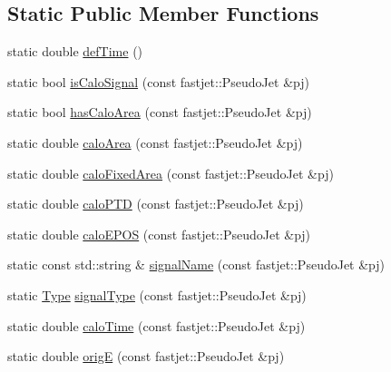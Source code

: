 \subsection*{Static Public Member Functions}
\begin{DoxyCompactItemize}
\item 
static double \hyperlink{classAnalysis_1_1FastJet_1_1CaloSignalInfo_aa4008fb819a90eba42de259914b9f799}{def\+Time} ()
\item 
static bool \hyperlink{classAnalysis_1_1FastJet_1_1CaloSignalInfo_ad3987a22c21aafdb3f074dfe6c15ddd4}{is\+Calo\+Signal} (const fastjet\+::\+Pseudo\+Jet \&pj)
\item 
static bool \hyperlink{classAnalysis_1_1FastJet_1_1CaloSignalInfo_a1d00cdcaf5f0c17d9d6aa07f1ec3e486}{has\+Calo\+Area} (const fastjet\+::\+Pseudo\+Jet \&pj)
\item 
static double \hyperlink{classAnalysis_1_1FastJet_1_1CaloSignalInfo_a5585d0b0e21cf7261fbfdd37d88de689}{calo\+Area} (const fastjet\+::\+Pseudo\+Jet \&pj)
\item 
static double \hyperlink{classAnalysis_1_1FastJet_1_1CaloSignalInfo_ab1772259e0578e51056a8e1cc8cdd342}{calo\+Fixed\+Area} (const fastjet\+::\+Pseudo\+Jet \&pj)
\item 
static double \hyperlink{classAnalysis_1_1FastJet_1_1CaloSignalInfo_a3cc740a3b70b82def83ffb9a6ff43cd3}{calo\+P\+TD} (const fastjet\+::\+Pseudo\+Jet \&pj)
\item 
static double \hyperlink{classAnalysis_1_1FastJet_1_1CaloSignalInfo_ac68b4786735b76e511b2f9b801025833}{calo\+E\+P\+OS} (const fastjet\+::\+Pseudo\+Jet \&pj)
\item 
static const std\+::string \& \hyperlink{classAnalysis_1_1FastJet_1_1CaloSignalInfo_a4bcba28ea7871f884c727df5f4d2520b}{signal\+Name} (const fastjet\+::\+Pseudo\+Jet \&pj)
\item 
static \hyperlink{classAnalysis_1_1FastJet_1_1CaloSignalInfo_ac03e8f6d7fb631eab49a9ab02cda7675}{Type} \hyperlink{classAnalysis_1_1FastJet_1_1CaloSignalInfo_a761a65bf1c957b4d7f0d37cf6f85d351}{signal\+Type} (const fastjet\+::\+Pseudo\+Jet \&pj)
\item 
static double \hyperlink{classAnalysis_1_1FastJet_1_1CaloSignalInfo_a815a75eb24f274d882f700e35aaf34b0}{calo\+Time} (const fastjet\+::\+Pseudo\+Jet \&pj)
\item 
static double \hyperlink{classAnalysis_1_1FastJet_1_1CaloSignalInfo_afb7471b4f7adcd5c4a0fe86f8c7d486b}{origE} (const fastjet\+::\+Pseudo\+Jet \&pj)
\item 

\end{DoxyCompactItemize}
